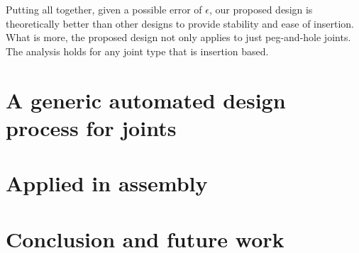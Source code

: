 \documentclass[11pt, twocolumn]{article}
\begin{document}
Putting all together, given a possible error of $\epsilon$, our proposed design is theoretically better than other designs to provide stability and ease of insertion. What is more, the proposed design not only applies to just peg-and-hole joints. The analysis holds for any joint type that is insertion based. 

\section{A generic automated design process for joints}
\label{sec:design}



\section{Applied in assembly}
\label{sec:exp}

\section{Conclusion and future work}

\renewcommand*{\bibfont}{\small}
\printbibliography
\end{document}
